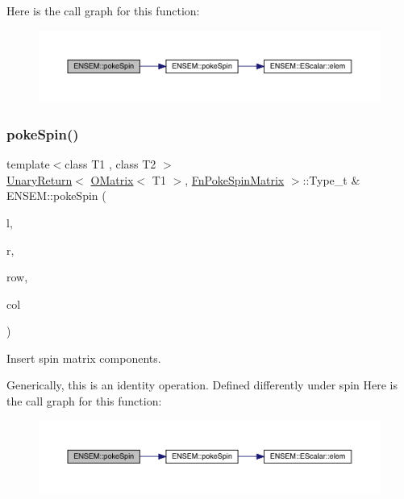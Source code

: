 Here is the call graph for this function\+:\nopagebreak
\begin{figure}[H]
\begin{center}
\leavevmode
\includegraphics[width=350pt]{d8/d55/group__obsmatrix_ga45420280324408e59bcbaca0ead5aa55_cgraph}
\end{center}
\end{figure}
\mbox{\label{group__obsmatrix_gade958f6bfe55cda547000e6badb137c7}} 
\subsubsection{\texorpdfstring{pokeSpin()}{pokeSpin()}\hspace{0.1cm}{\footnotesize\ttfamily [2/2]}}
{\footnotesize\ttfamily template$<$class T1 , class T2 $>$ \\
\mbox{\hyperlink{structENSEM_1_1UnaryReturn}{Unary\+Return}}$<$ \mbox{\hyperlink{classENSEM_1_1OMatrix}{O\+Matrix}}$<$ T1 $>$, \mbox{\hyperlink{structENSEM_1_1FnPokeSpinMatrix}{Fn\+Poke\+Spin\+Matrix}} $>$\+::Type\+\_\+t \& E\+N\+S\+E\+M\+::poke\+Spin (\begin{DoxyParamCaption}\item[{\mbox{\hyperlink{classENSEM_1_1OMatrix}{O\+Matrix}}$<$ T1 $>$ \&}]{l,  }\item[{const \mbox{\hyperlink{classENSEM_1_1OMatrix}{O\+Matrix}}$<$ T2 $>$ \&}]{r,  }\item[{int}]{row,  }\item[{int}]{col }\end{DoxyParamCaption})\hspace{0.3cm}{\ttfamily [inline]}}



Insert spin matrix components. 

Generically, this is an identity operation. Defined differently under spin Here is the call graph for this function\+:\nopagebreak
\begin{figure}[H]
\begin{center}
\leavevmode
\includegraphics[width=350pt]{d8/d55/group__obsmatrix_gade958f6bfe55cda547000e6badb137c7_cgraph}
\end{center}
\end{figure}
\mbox{\label{group__obsmatrix_gaa89ce5a88c3ccb5020ce1319e041cacd}} 

